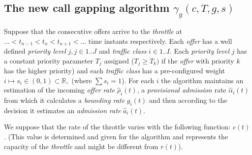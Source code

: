 \documentclass[conference]{IEEEtran}
\newcommand{\comment}[1]{}
\begin{document}
\subsection{The new call gapping algorithm $\gamma_g(c,T,g,s)$}
Suppose that the consecutive offers arrive to the \textit{throttle}
at $...<t_{n-1}<t_n<t_{n+1}<...$ time instants respectively. Each
\textit{offer} has a well defined \textit{priority level}
$j,j\in1..J$ and \textit{traffic class} $i\in1..I$. Each
\textit{priority level} $j$ has a constant priority parameter $T_j$
assigned ($T_j\geq T_k)$ if the \textit{offer} with priority $k$ has
the higher priority) and each \textit{traffic class} has a
pre-configured weight $i\mapsto s_i\in(0,1)\subset\mathds{R},$
(where $\sum s_i=1$). For each $i$ the algorithm maintains an
estimation of the incoming \textit{offer rate} $\hat{\rho}_i(t)$, a
\textit{provisional admission} rate $\hat{\alpha}_i(t)$ from which
it calculates a \textit{bounding rate} $g_i(t)$ and then according
to the decision it estimates an \textit{admission rate}
$\hat{a}_i(t)$.

We suppose that the rate of the throttle varies with the following
function: $c(t)$. (This value is determined and given for the
algorithm and represents the capacity of the \textit{throttle} and
might be different from $r(t)$). \comment{We propose that the timer
$T_j:=K/c(t)$ where $K$ is an arbitrary constant that we will
explain later.}
\end{document}
